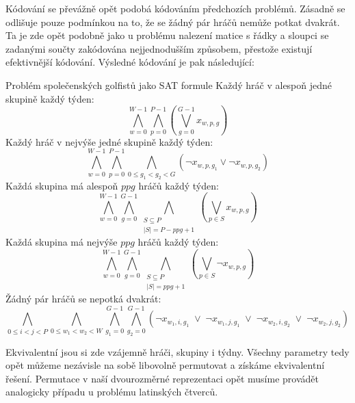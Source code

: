 Kódování se převážně opět podobá kódováním předchozích problémů. Zásadně se odlišuje pouze podmínkou na to, že se žádný pár hráčů nemůže potkat dvakrát. Ta je zde opět podobně jako u problému nalezení matice s řádky a sloupci se zadanými součty zakódována nejjednodušším způsobem, přestože existují efektivnější kódování. Výsledné kódování je pak následující:
\begin{pozn}{Problém společenských golfistů jako SAT formule}
Každý hráč v alespoň jedné skupině každý týden:
\[
\bigwedge_{w=0}^{W-1} \bigwedge_{p=0}^{P-1}
\left( \bigvee_{g=0}^{G-1} x_{w,p,g} \right)
\]
Každý hráč v nejvýše jedné skupině každý týden:
\[
\bigwedge_{w=0}^{W-1} \bigwedge_{p=0}^{P-1}
\bigwedge_{0 \le g_1 < g_2 < G}
\left( \neg x_{w,p,g_1} \vee \neg x_{w,p,g_2} \right)
\]
Každá skupina má alespoň $ppg$ hráčů každý týden:
\[
\bigwedge_{w=0}^{W-1} \bigwedge_{g=0}^{G-1}
\bigwedge_{\substack{S \subseteq P \\ |S| = P - ppg + 1}}
\left( \bigvee_{p \in S} x_{w,p,g} \right)
\]
Každá skupina má nejvýše $ppg$ hráčů každý týden:
\[
\bigwedge_{w=0}^{W-1} \bigwedge_{g=0}^{G-1}
\bigwedge_{\substack{S \subseteq P \\ |S| = ppg + 1}}
\left( \bigvee_{p \in S} \neg x_{w,p,g} \right)
\]
Žádný pár hráčů se nepotká dvakrát:
\[
\bigwedge_{0 \le i < j < P}
\bigwedge_{0 \le w_1 < w_2 < W}
\bigwedge_{g_1=0}^{G-1} \bigwedge_{g_2=0}^{G-1}
\left(
\neg x_{w_1,i,g_1} \;\vee\;
\neg x_{w_1,j,g_1} \;\vee\;
\neg x_{w_2,i,g_2} \;\vee\;
\neg x_{w_2,j,g_2}
\right)
\]
\end{pozn}

Ekvivalentní jsou si zde vzájemně hráči, skupiny i týdny. Všechny parametry tedy opět můžeme nezávisle na sobě libovolně permutovat a získáme ekvivalentní řešení. Permutace v naší dvourozměrné reprezentaci opět musíme provádět analogicky případu u problému latinských čtverců.